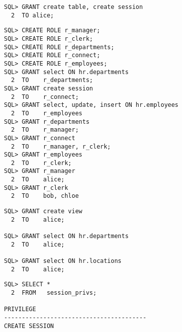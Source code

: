 \begin{enumerate}
\begin{lstlisting}[language=oracle_sql]
SQL> GRANT create table, create session
  2  TO alice;
      \end{lstlisting}
\clearpage	  
    
      \begin{lstlisting}[language=oracle_sql]
SQL> CREATE ROLE r_manager;
SQL> CREATE ROLE r_clerk;
SQL> CREATE ROLE r_departments;
SQL> CREATE ROLE r_connect;
SQL> CREATE ROLE r_employees;
SQL> GRANT select ON hr.departments
  2  TO    r_departments;
SQL> GRANT create session
  2  TO    r_connect;
SQL> GRANT select, update, insert ON hr.employees
  2  TO    r_employees
SQL> GRANT r_departments
  2  TO    r_manager;
SQL> GRANT r_connect
  2  TO    r_manager, r_clerk;
SQL> GRANT r_employees
  2  TO    r_clerk;
SQL> GRANT r_manager
  2  TO    alice;
SQL> GRANT r_clerk
  2  TO    bob, chloe
      \end{lstlisting}
    
    \begin{lstlisting}[language=oracle_sql]
SQL> GRANT create view
  2  TO    alice;

SQL> GRANT select ON hr.departments
  2  TO    alice;

SQL> GRANT select ON hr.locations
  2  TO    alice;
    \end{lstlisting}
\clearpage
    
      \begin{lstlisting}[language=oracle_sql]
SQL> SELECT *
  2  FROM   session_privs;

PRIVILEGE
----------------------------------------
CREATE SESSION
      \end{lstlisting}
  \end{enumerate}

